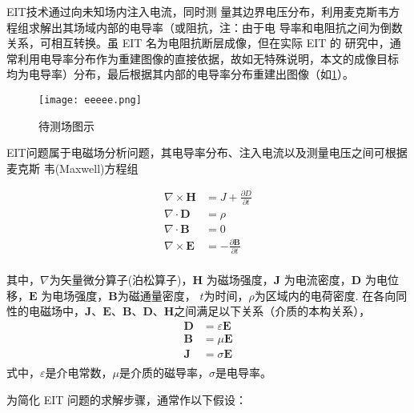 EIT技术通过向未知场内注入电流，同时测
量其边界电压分布，利用麦克斯韦方程组求解出其场域内部的电导率（或阻抗，注：由于电
导率和电阻抗之间为倒数关系，可相互转换。虽 EIT 名为电阻抗断层成像，但在实际 EIT 的
研究中，通常利用电导率分布作为重建图像的直接依据，故如无特殊说明，本文的成像目标
均为电导率）分布，最后根据其内部的电导率分布重建出图像（如\cref{figure:eeeee}）。

\begin{figure}[h]
  \centering
  \texttt{[image: eeeee.png]}
  \caption{待测场图示}
  \label{figure:eeeee}
\end{figure}

EIT问题属于电磁场分析问题，其电导率分布、注入电流以及测量电压之间可根据麦克斯
韦(Maxwell)方程组

\begin{equation}
\label{equation:Maxwell}
    \begin{aligned}
        \nabla \times \boldsymbol{H} &= J + \frac{\partial{D}}{\partial{t}} \\
        \nabla \cdot \boldsymbol{D} &= \rho \\
        \nabla \cdot \boldsymbol{B} &= 0 \\
        \nabla \times\boldsymbol{E} &= -\frac{\partial \boldsymbol{B}}{\partial t} \\   
    \end{aligned}
\end{equation}

其中，$\nabla$为矢量微分算子(泊松算子)，$\boldsymbol{H}$ 为磁场强度，$\boldsymbol{J}$ 为电流密度，$\boldsymbol{D}$
为电位移，$\boldsymbol{E}$ 为电场强度，$\boldsymbol{B}$为磁通量密度， $t$为时间，$\rho$为区域内的电荷密度.
在各向同性的电磁场中，$\boldsymbol{J}$、$\boldsymbol{E}$、$\boldsymbol{B}$、$\boldsymbol{D}$、$\boldsymbol{H}$之间满足以下关系（介质的本构关系），
\begin{equation}
  \label{equation:Maxwell_relation}
  \begin{aligned}
    \boldsymbol{D} &= \varepsilon\boldsymbol{E}\\
    \boldsymbol{B} & = \mu\boldsymbol{E}\\
    \boldsymbol{J} & = \sigma\boldsymbol{E}\\
  \end{aligned}
\end{equation}
式中，$\varepsilon$是介电常数，$\mu$是介质的磁导率，$\sigma$是电导率。

为简化 EIT 问题的求解步骤，通常作以下假设：

